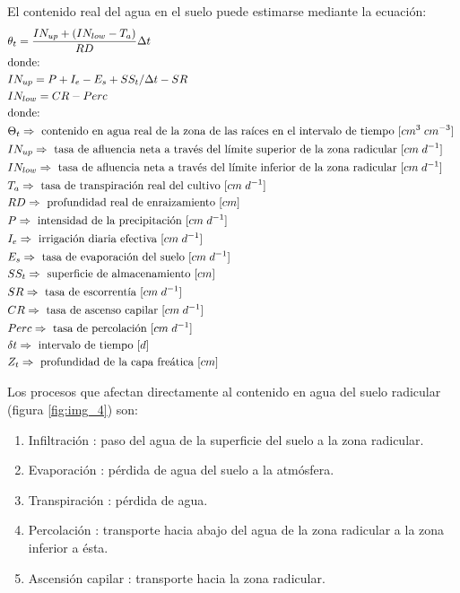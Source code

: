 El contenido real del agua en el suelo puede estimarse mediante la ecuación:
\begin{align*}
	&\theta_t = \frac{IN_{up}+(IN_{low}-T_a)}{RD}\Delta t \\
	&\text{donde: } \\
	&IN_{up}=P+I_e-E_s+SS_t/\Delta t - SR \\
	&IN_{low}=CR-Perc \\
	&\text{donde: } \\
	&\Theta_t  \Rightarrow \text{ contenido en agua real de la zona de las raíces en el intervalo de tiempo [$ cm^3 \; cm^{-3} $] } \\
	&IN_{up} \Rightarrow \text{ tasa de afluencia neta a través del límite superior de la zona radicular [$ cm \; d^{-1} $]} \\
	&IN_{low} \Rightarrow \text{ tasa de afluencia neta a través del límite inferior de la zona radicular [$ cm \; d^{-1} $]} \\
	&T_a \Rightarrow \text{ tasa de transpiración real del cultivo [$ cm \; d^{-1} $]} \\
	&RD \Rightarrow \text{ profundidad real de enraizamiento  [$ cm $]} \\
	&P \Rightarrow \text{ intensidad de la precipitación  [$ cm \; d^{-1} $]} \\
	&I_e \Rightarrow \text{ irrigación diaria efectiva  [$ cm \; d^{-1} $]} \\
	&E_s \Rightarrow \text{ tasa de evaporación del suelo [$ cm \; d^{-1} $]} \\
	&SS_t \Rightarrow \text{ superficie de almacenamiento [$ cm $]} \\
	&SR \Rightarrow \text{ tasa de escorrentía [$ cm \; d^{-1} $]} \\
	&CR \Rightarrow \text{ tasa de ascenso capilar [$ cm \; d^{-1} $]} \\
	&Perc \Rightarrow \text{ tasa de percolación [$ cm \; d^{-1} $]} \\
	&\delta t \Rightarrow \text{ intervalo de tiempo [$ d $]} \\
	&Z_t \Rightarrow \text{ profundidad de la capa freática [$ cm $]} \\
\end{align*}

Los procesos que afectan directamente al contenido en agua del suelo radicular (figura \ref{fig:img_4}) son:
\begin{enumerate}
	\item Infiltración : paso del agua de la superficie del suelo a la zona radicular.
	\item Evaporación : pérdida de agua del suelo a la atmósfera.
	\item Transpiración : pérdida de agua.
	\item Percolación : transporte hacia abajo del agua de la zona radicular a la zona inferior a ésta.
	\item Ascensión capilar : transporte hacia la zona radicular.
\end{enumerate}

